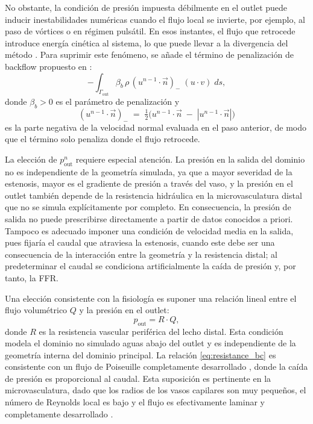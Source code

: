 \documentclass[12pt, letterpaper]{article}
\begin{document}
No obstante, la condición de presión impuesta débilmente en el outlet puede inducir inestabilidades numéricas cuando el flujo local se invierte, por ejemplo, al paso de vórtices o en régimen pulsátil. En esos instantes, el flujo que retrocede introduce energía cinética al sistema, lo que puede llevar a la divergencia del método \cite{bc_backflow_hemo,modified_bc_hemo}. Para suprimir este fenómeno, se añade el término de penalización de backflow propuesto en \cite{bc_backflow_hemo}:
\begin{equation}
  \label{eq:backflow_term}
  -\int_{\Gamma_\mathrm{out}} \beta_b \, \rho \, (u^{n-1} \cdot \vec{n})_- \; (u \cdot v) \; ds,
\end{equation}
\noindent donde $\beta_b > 0$ es el parámetro de penalización y
\begin{equation*}
  (u^{n-1} \cdot \vec{n})_- \;=\; \tfrac{1}{2}\bigl(u^{n-1}\cdot \vec{n} \;-\; |u^{n-1}\cdot \vec{n}|\bigr)
\end{equation*}
es la parte negativa de la velocidad normal evaluada en el paso anterior, de modo que el término solo penaliza donde el flujo retrocede.

La elección de $p_{\mathrm{out}}^n$ requiere especial atención. La presión en la salida del dominio no es independiente de la geometría simulada, ya que a mayor severidad de la estenosis, mayor es el gradiente de presión a través del vaso, y la presión en el outlet también depende de la resistencia hidráulica en la microvasculatura distal que no se simula explícitamente por completo. En consecuencia, la presión de salida no puede prescribirse directamente a partir de datos conocidos a priori. Tampoco es adecuado imponer una condición de velocidad media en la salida, pues fijaría el caudal que atraviesa la estenosis, cuando este debe ser una consecuencia de la interacción entre la geometría y la resistencia distal; al predeterminar el caudal se condiciona artificialmente la caída de presión y, por tanto, la FFR.

Una elección consistente con la fisiología es suponer una relación lineal entre el flujo volumétrico $Q$ y la presión en el outlet:
\begin{equation}
  \label{eq:resistance_bc}
  p_{\mathrm{out}} = R \cdot Q,
\end{equation}
\noindent donde $R$ es la resistencia vascular periférica del lecho distal. Esta condición modela el dominio no simulado aguas abajo del outlet y es independiente de la geometría interna del dominio principal. La relación \eqref{eq:resistance_bc} es consistente con un flujo de Poiseuille completamente desarrollado \cite{mcdonalds_fisiology}, donde la caída de presión es proporcional al caudal. Esta suposición es pertinente en la microvasculatura, dado que los radios de los vasos capilares son muy pequeños, el número de Reynolds local es bajo y el flujo es efectivamente laminar y completamente desarrollado \cite{outflow_resistance}.
\end{document}
